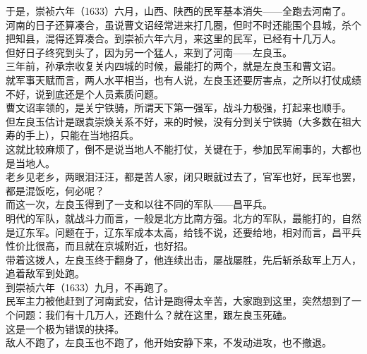 \begin{multicols}{\theparacolNo}
于是，崇祯六年（1633）六月，山西、陕西的民军基本消失——全跑去河南了。\\

河南的日子还算凑合，虽说曹文诏经常进来打几圈，但时不时还能围个县城，杀个把知县，混得还算凑合。到崇祯六年六月，来这里的民军，已经有十几万人。\\

但好日子终究到头了，因为另一个猛人，来到了河南——左良玉。\\

三年前，孙承宗收复关内四城的时候，最能打的两个，就是左良玉和曹文诏。\\

就军事天赋而言，两人水平相当，也有人说，左良玉还要厉害点，之所以打仗成绩不好，说到底还是个人员素质问题。\\

曹文诏率领的，是关宁铁骑，所谓天下第一强军，战斗力极强，打起来也顺手。\\

但左良玉估计是跟袁崇焕关系不好，来的时候，没有分到关宁铁骑（大多数在祖大寿的手上），只能在当地招兵。\\

这就比较麻烦了，倒不是说当地人不能打仗，关键在于，参加民军闹事的，大都也是当地人。\\

老乡见老乡，两眼泪汪汪，都是苦人家，闭只眼就过去了，官军也好，民军也罢，都是混饭吃，何必呢？\\

而这一次，左良玉得到了一支和以往不同的军队——昌平兵。\\

明代的军队，就战斗力而言，一般是北方比南方强。北方的军队，最能打的，自然是辽东军。问题在于，辽东军成本太高，给钱不说，还要给地，相对而言，昌平兵性价比很高，而且就在京城附近，也好招。\\

带着这拨人，左良玉终于翻身了，他连续出击，屡战屡胜，先后斩杀敌军上万人，追着敌军到处跑。\\

到崇祯六年（1633）九月，不再跑了。\\

民军主力被他赶到了河南武安，估计是跑得太辛苦，大家跑到这里，突然想到了一个问题：我们有十几万人，还跑什么？就在这里，跟左良玉死磕。\\

这是一个极为错误的抉择。\\

敌人不跑了，左良玉也不跑了，他开始安静下来，不发动进攻，也不撤退。\\


\end{multicols}
